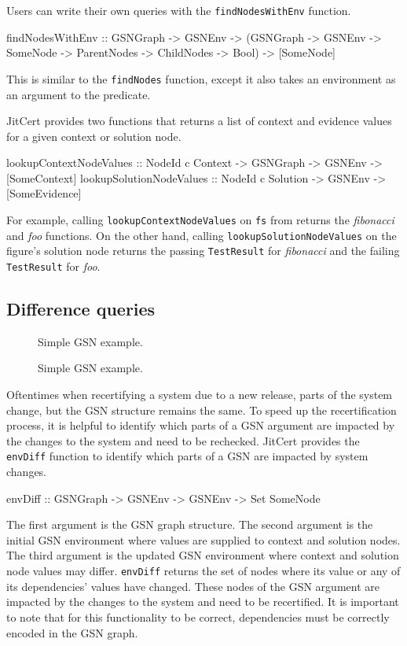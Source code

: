 \documentclass{article}
\newcommand{\jitcert}{JitCert\xspace}
\begin{document}
Users can write their own queries with the \texttt{findNodesWithEnv} function. 
\begin{code}
findNodesWithEnv :: GSNGraph -> GSNEnv -> (GSNGraph -> GSNEnv -> SomeNode -> ParentNodes -> ChildNodes -> Bool) -> [SomeNode]
\end{code}
This is similar to the \texttt{findNodes} function, except it also takes an environment as an argument to the predicate.

\jitcert provides two functions that returns a list of context and evidence values for a given context or solution node. 
\begin{code}
lookupContextNodeValues :: NodeId c Context -> GSNGraph -> GSNEnv
    -> [SomeContext]
lookupSolutionNodeValues :: NodeId c Solution -> GSNEnv
    -> [SomeEvidence]
\end{code}
For example, calling \texttt{lookupContextNodeValues} on \texttt{fs} from  returns the \emph{fibonacci} and \emph{foo} functions. 
On the other hand, calling \texttt{lookupSolutionNodeValues} on the figure's solution node returns the passing \texttt{TestResult} for \emph{fibonacci}
and the failing \texttt{TestResult} for \emph{foo}.

\subsection{Difference queries}

\begin{figure}
\centering
{}
\caption{Simple GSN example.}
\label{fig:fig9}
\end{figure}

\begin{figure}
\centering
{}
\caption{Simple GSN example.}
\label{fig:fig10}
\end{figure}

Oftentimes when recertifying a system due to a new release, parts of the system change, but the GSN structure remains the same. 
To speed up the recertification process, it is helpful to identify which parts of a GSN argument are impacted by the changes to the system and need to be rechecked. 
\jitcert provides the \texttt{envDiff} function to identify which parts of a GSN are impacted by system changes.
\begin{code}
envDiff :: GSNGraph -> GSNEnv -> GSNEnv -> Set SomeNode
\end{code}
The first argument is the GSN graph structure. 
The second argument is the initial GSN environment where values are supplied to context and solution nodes. 
The third argument is the updated GSN environment where context and solution node values may differ.
\texttt{envDiff} returns the set of nodes where its value or any of its dependencies' values have changed. 
These nodes of the GSN argument are impacted by the changes to the system and need to be recertified. 
It is important to note that for this functionality to be correct, dependencies must be correctly encoded in the GSN graph. 
\end{document}
